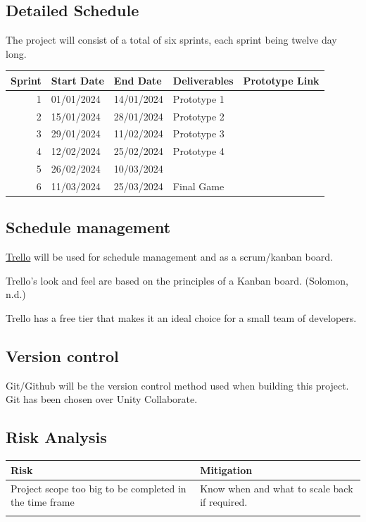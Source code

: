 \documentclass{article}
\begin{document}
\subsection{Detailed Schedule}
\label{sec:org2953800}
The project will consist of a total of six sprints, each sprint being twelve day long.

\begin{center}
\begin{tabular}{rllll}
Sprint & Start Date & End Date & Deliverables & Prototype Link\\[0pt]
\hline
1 & 01/01/2024 & 14/01/2024 & Prototype 1 & \\[0pt]
2 & 15/01/2024 & 28/01/2024 & Prototype 2 & \\[0pt]
3 & 29/01/2024 & 11/02/2024 & Prototype 3 & \\[0pt]
4 & 12/02/2024 & 25/02/2024 & Prototype 4 & \\[0pt]
5 & 26/02/2024 & 10/03/2024 &  & \\[0pt]
6 & 11/03/2024 & 25/03/2024 & Final Game & \\[0pt]
\end{tabular}
\end{center}
\subsection{Schedule management}
\label{sec:org2ccab92}
\href{https://trello.com/}{Trello} will be used for schedule management and as a scrum/kanban board.

Trello’s look and feel are based on the principles of a Kanban board. (Solomon, n.d.)

Trello has a free tier that makes it an ideal choice for a small team of developers.
\subsection{Version control}
\label{sec:org61d5fd6}
Git/Github will be the version control method used when building this project.
Git has been chosen over Unity Collaborate.
\subsection{Risk Analysis}
\label{sec:org0f0f54d}
\begin{center}
\begin{tabular}{ll}
Risk & Mitigation\\[0pt]
\hline
Project scope too big to be completed in the time frame & Know when and what to scale back if required.\\[0pt]
 & \\[0pt]
\end{tabular}
\end{center}
\end{document}
